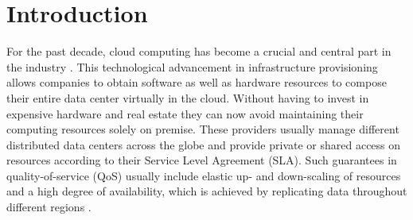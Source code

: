 \chapter{Introduction}
\label{c:intro}

For the past decade, cloud computing has become a crucial and central part in the industry \cite{claremont:2005}.
This technological advancement in infrastructure provisioning allows companies to obtain 
software as well as hardware resources to compose their entire data center virtually in the cloud.
Without having to invest in expensive hardware and real estate they can now avoid maintaining 
their computing resources solely on premise. These providers usually manage different distributed data centers 
across the globe and provide private or shared access on resources according to their 
Service Level Agreement (SLA). Such guarantees in quality-of-service (QoS) usually 
include elastic up- and down-scaling of resources and a high degree of availability,
which is achieved by replicating data throughout different regions \cite{brinkmann:2015} \cite{terry:2013}. 

